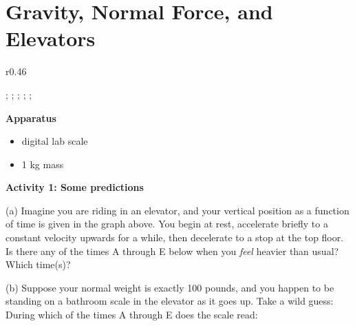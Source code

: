 \section{Gravity, Normal Force, and Elevators}

\begin{comment}
This lab is based on an activity I've done in class for several years.  This year, I'll try for the first time to write it as a somewhat structured series of written questions.  We'll see how this works!   --Matt Trawick, 9/2019

\end{comment}

\makelabheader %

\begin{wrapfigure}[4]{r}{0.46\textwidth}
    \vspace{-0.3in}
\begin{lab_axis}[lab_noticks_1quad,
	height = {1.5in}, width = {3in},
	ymax=1.1,
	xlabel={Time},
	ylabel={Position},
	xtick={0.1,0.3,0.5,0.7,0.9},
	xticklabels={A,B,C,D,E},
	]
;
;
;
;
;
\end{lab_axis}
\end{wrapfigure}

\bigskip
\textbf{Apparatus}

\begin{itemize}[nosep]
\item digital lab scale
\item 1 kg mass
\end{itemize}

\bigskip
\bigskip
\textbf{Activity 1: Some predictions}

(a) Imagine you are riding in an elevator, and your vertical position as a function of time is given in the graph above.  You begin at rest, accelerate briefly to a constant velocity upwards for a while, then decelerate to a stop at the top floor.  Is there any of the times A through E below when you \textit{feel} heavier than usual?  Which time(s)?
\answerspace{0.4in}


(b) Suppose your normal weight is exactly 100 pounds, and you happen to be standing on a bathroom scale in the elevator as it goes up.  Take a wild guess: During which of the times A through E does the scale read:

